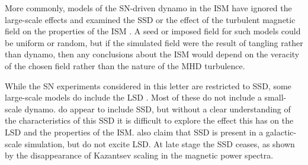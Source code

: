\documentclass[preprint2]{aastex63}
\begin{document}
More commonly, models of the SN-driven dynamo in the ISM have ignored the 
large-scale effects and examined the SSD or the effect of the
turbulent magnetic field on the properties of the ISM
\citep[e.g.,][]{BKMM04,BalKim05,MacLow:2005}.
A seed or imposed field for such models could be uniform or random, but if the
simulated field
   were the result of
tangling rather than dynamo, then any conclusions
about the ISM
    would
depend on the veracity of the chosen field rather than the 
nature of the MHD turbulence.

While the SN experiments considered in this letter are restricted to SSD, some
large-scale models do include the LSD
\citep[e.g.,][]{Gressel:2008,HWK09,WA09,Gent:2013b,EGSFB16,Pakmor17,SBADMN19,SDLMBP20,GE20}.
Most of these do not include a small-scale dynamo.
\citet{Gent:2013b,EGSFB16} do appear to include SSD, but without a clear
understanding of the characteristics of this SSD it is difficult to explore the
effect this has on the LSD and the properties of the ISM.
\citet{SBADMN19,SDLMBP20} also claim that SSD is present in a galactic-scale
simulation, but do not excite LSD. 
At late stage the SSD ceases,
     as shown by
the disappearance of Kazantsev scaling in the magnetic power spectra.
\end{document}
